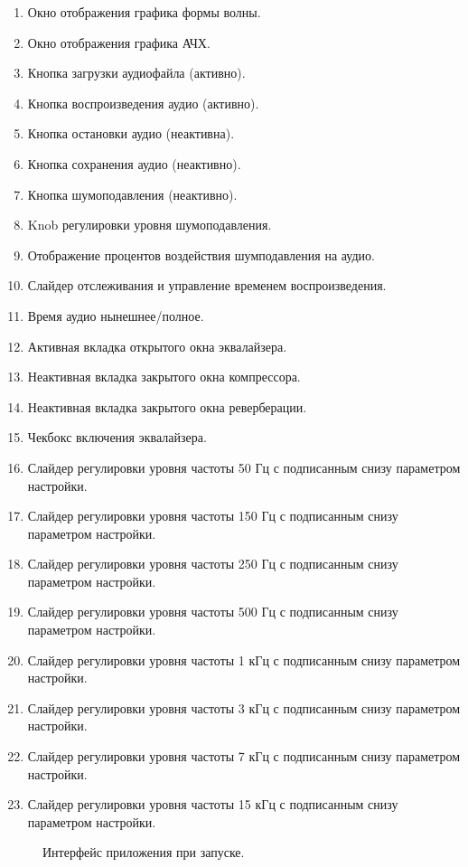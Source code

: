 \begin{enumerate}
	\item Окно отображения графика формы волны.
	\item Окно отображения графика АЧХ.
	\item Кнопка загрузки аудиофайла (активно).
	\item Кнопка воспроизведения аудио (активно).
	\item Кнопка остановки аудио (неактивна).
	\item Кнопка сохранения аудио (неактивно).
	\item Кнопка шумоподавления (неактивно).
	\item Knob регулировки уровня шумоподавления.
	\item Отображение процентов воздействия шумподавления на аудио.
	\item Слайдер отслеживания и управление временем воспроизведения.
	\item Время аудио нынешнее/полное.
	\item Активная вкладка открытого окна эквалайзера.
	\item Неактивная вкладка закрытого окна компрессора.
	\item Неактивная вкладка закрытого окна реверберации.
	\item Чекбокс включения эквалайзера.
	\item Слайдер регулировки уровня частоты 50 Гц с подписанным снизу параметром настройки.
	\item Слайдер регулировки уровня частоты 150 Гц с подписанным снизу параметром настройки.
	\item Слайдер регулировки уровня частоты 250 Гц с подписанным снизу параметром настройки.
	\item Слайдер регулировки уровня частоты 500 Гц с подписанным снизу параметром настройки.
	\item Слайдер регулировки уровня частоты 1 кГц с подписанным снизу параметром настройки.
	\item Слайдер регулировки уровня частоты 3 кГц с подписанным снизу параметром настройки.
	\item Слайдер регулировки уровня частоты 7 кГц с подписанным снизу параметром настройки.
	\item Слайдер регулировки уровня частоты 15 кГц с подписанным снизу параметром настройки.
\end{enumerate}

\begin{figure}[ht]
	\caption{Интерфейс приложения при запуске.}
	\label{InterProg:image}
\end{figure}

